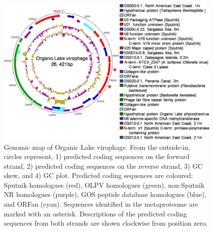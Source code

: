 \begin{figure}
\includegraphics[width=\textwidth]{olv_figures/OLV_genome.pdf}
\caption[Genomic map of Organic Lake virophage]{Genomic map of Organic Lake virophage. From the outside-in, circles represent, 1) predicted coding sequences on the forward strand, 2) predicted coding sequences on the reverse strand, 3) GC skew, and 4) GC plot. Predicted coding sequences are coloured: Sputnik homologues (red), OLPV homologues (green), non-Sputnik \ac{NR} homologues (purple), \ac{GOS} peptide database homologues (blue), and ORFan (cyan). Sequences identified in the metaproteome are marked with an asterisk. Descriptions of the predicted coding sequences from both strands are shown clockwise from position zero.
}
\label{fig:OLV_genome}

\end{figure}
